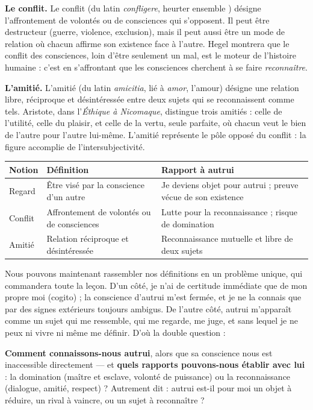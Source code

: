\documentclass[11pt]{article}
\newcommand{\cle}[1]{{\popxbold\color{popdark}#1}}
\newcounter{popsec}
\newcounter{popsub}
\newcommand{\courssub}[1]{%
  \stepcounter{popsub}%
  \par\vspace{9pt}\noindent{\popxbold\fontsize{11.5}{13}\selectfont\color{popink}{\color{poporange}\thepopsec.\thepopsub}\hspace{6pt}#1}\par\nopagebreak\vspace{4pt}
}
\begin{document}
\textbf{Le conflit.} Le \cle{conflit} (du latin \emph{confligere}, \guillemotleft heurter ensemble \guillemotright) désigne l'affrontement de volontés ou de consciences qui s'opposent. Il peut être destructeur (guerre, violence, exclusion), mais il peut aussi être un mode de relation où chacun affirme son existence face à l'autre. Hegel montrera que le conflit des consciences, loin d'être seulement un mal, est le moteur de l'histoire humaine : c'est en s'affrontant que les consciences cherchent à se faire \emph{reconnaître}.

\textbf{L'amitié.} L'\cle{amitié} (du latin \emph{amicitia}, lié à \emph{amor}, l'amour) désigne une relation libre, réciproque et désintéressée entre deux sujets qui se reconnaissent comme tels. Aristote, dans l'\emph{Éthique à Nicomaque}, distingue trois amitiés : celle de l'utilité, celle du plaisir, et celle de la vertu, seule parfaite, où chacun veut le bien de l'autre pour l'autre lui-même. L'amitié représente le pôle opposé du conflit : la figure accomplie de l'intersubjectivité.

\begin{center}
\begin{tabularx}{\linewidth}{|l|X|X|}
\hline
\rowcolor{popblueL} \textbf{Notion} & \textbf{Définition} & \textbf{Rapport à autrui} \\
\hline
Regard & Être visé par la conscience d'un autre & Je deviens objet pour autrui ; preuve vécue de son existence \\
\hline
Conflit & Affrontement de volontés ou de consciences & Lutte pour la reconnaissance ; risque de domination \\
\hline
Amitié & Relation réciproque et désintéressée & Reconnaissance mutuelle et libre de deux sujets \\
\hline
\end{tabularx}
\end{center}

\courssub{Formulation de la problématique}

Nous pouvons maintenant rassembler nos définitions en un problème unique, qui commandera toute la leçon. D'un côté, je n'ai de certitude immédiate que de mon propre moi (cogito) ; la conscience d'autrui m'est fermée, et je ne la connais que par des signes extérieurs toujours ambigus. De l'autre côté, autrui m'apparaît comme un sujet qui me ressemble, qui me regarde, me juge, et sans lequel je ne peux ni vivre ni même me définir. D'où la double question :

\begin{aretenir}
\textbf{Comment connaissons-nous autrui}, alors que sa conscience nous est inaccessible directement — et \textbf{quels rapports pouvons-nous établir avec lui} : la domination (maître et esclave, volonté de puissance) ou la reconnaissance (dialogue, amitié, respect) ? Autrement dit : autrui est-il pour moi un objet à réduire, un rival à vaincre, ou un sujet à reconnaître ?
\end{aretenir}
\end{document}
